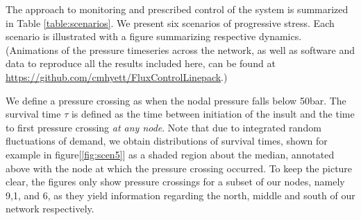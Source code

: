 

The approach to monitoring and prescribed control of the system is summarized in Table \ref{table:scenarios}. We present six scenarios of progressive stress. Each scenario is illustrated with a figure summarizing respective dynamics. (Animations of the pressure timeseries across the network, as well as software and data to reproduce all the results included here, can be found at \url{https://github.com/cmhyett/FluxControlLinepack}.)

We define a pressure crossing as when the nodal pressure falls below 50bar. The survival time $\tau$ is defined as the time between initiation of the insult and the time to first pressure crossing \textit{at any node}. 
Note that due to integrated random fluctuations of demand, we obtain distributions of survival times, shown for example in figure[\ref{fig:scen5}] as a shaded region about the median, annotated above with the node at which the pressure crossing occurred. To keep the picture clear, the figures only show pressure crossings for a subset of our nodes, namely 9,1, and 6, as they yield information regarding the north, middle and south of our network respectively. 

